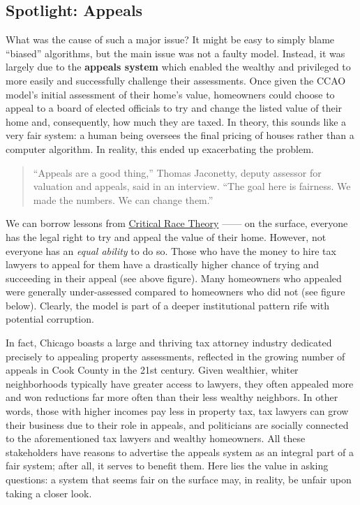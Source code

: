 \documentclass[
  letterpaper,
  DIV=11,
  numbers=noendperiod]{scrreprt}
\begin{document}
\subsection{Spotlight: Appeals}\label{spotlight-appeals}

What was the cause of such a major issue? It might be easy to simply
blame ``biased'' algorithms, but the main issue was not a faulty model.
Instead, it was largely due to the \textbf{appeals system} which enabled
the wealthy and privileged to more easily and successfully challenge
their assessments. Once given the CCAO model's initial assessment of
their home's value, homeowners could choose to appeal to a board of
elected officials to try and change the listed value of their home and,
consequently, how much they are taxed. In theory, this sounds like a
very fair system: a human being oversees the final pricing of houses
rather than a computer algorithm. In reality, this ended up exacerbating
the problem.

\begin{quote}
``Appeals are a good thing,'' Thomas Jaconetty, deputy assessor for
valuation and appeals, said in an interview. ``The goal here is
fairness. We made the numbers. We can change them.''
\end{quote}

We can borrow lessons from
\href{https://www.britannica.com/topic/critical-race-theory}{Critical
Race Theory} ------ on the surface, everyone has the legal right to try
and appeal the value of their home. However, not everyone has an
\emph{equal ability} to do so. Those who have the money to hire tax
lawyers to appeal for them have a drastically higher chance of trying
and succeeding in their appeal (see above figure). Many homeowners who
appealed were generally under-assessed compared to homeowners who did
not (see figure below). Clearly, the model is part of a deeper
institutional pattern rife with potential corruption.

In fact, Chicago boasts a large and thriving tax attorney industry
dedicated precisely to appealing property assessments, reflected in the
growing number of appeals in Cook County in the 21st century. Given
wealthier, whiter neighborhoods typically have greater access to
lawyers, they often appealed more and won reductions far more often than
their less wealthy neighbors. In other words, those with higher incomes
pay less in property tax, tax lawyers can grow their business due to
their role in appeals, and politicians are socially connected to the
aforementioned tax lawyers and wealthy homeowners. All these
stakeholders have reasons to advertise the appeals system as an integral
part of a fair system; after all, it serves to benefit them. Here lies
the value in asking questions: a system that seems fair on the surface
may, in reality, be unfair upon taking a closer look.
\end{document}
